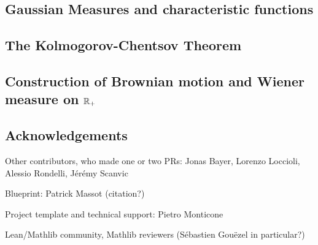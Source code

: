 \documentclass[lean]{DraftAFM}
\begin{document}
\subsection{Gaussian Measures and characteristic functions}

\subsection{The Kolmogorov-Chentsov Theorem}

\subsection{Construction of Brownian motion and Wiener measure on $\mathbb{R}_+$}



\subsection{Acknowledgements}

Other contributors, who made one or two PRs: Jonas Bayer, Lorenzo Loccioli, Alessio Rondelli, Jérémy Scanvic

Blueprint: Patrick Massot (citation?)

Project template \cite{Monticone_LeanProject_2025} and technical support: Pietro Monticone

Lean/Mathlib community, Mathlib reviewers (Sébastien Gouëzel in particular?)

\printbibliography
\end{document}
